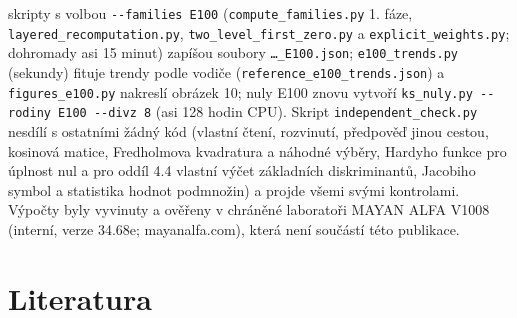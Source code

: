 \documentclass[
  10pt,
]{article}
\begin{document}
skripty s volbou \texttt{-\/-families\ E100}
(\texttt{compute\_families.py} 1. fáze,
\texttt{layered\_recomputation.py}, \texttt{two\_level\_first\_zero.py}
a \texttt{explicit\_weights.py}; dohromady asi 15 minut) zapíšou soubory
\texttt{…\_E100.json}; \texttt{e100\_trends.py} (sekundy) fituje trendy
podle vodiče (\texttt{reference\_e100\_trends.json}) a
\texttt{figures\_e100.py} nakreslí obrázek 10; nuly E100 znovu vytvoří
\texttt{ks\_nuly.py\ -\/-rodiny\ E100\ -\/-divz\ 8} (asi 128 hodin CPU).
Skript \texttt{independent\_check.py} nesdílí s ostatními žádný kód
(vlastní čtení, rozvinutí, předpověď jinou cestou, kosinová matice,
Fredholmova kvadratura a náhodné výběry, Hardyho funkce pro úplnost nul
a pro oddíl 4.4 vlastní výčet základních diskriminantů, Jacobiho symbol
a statistika hodnot podmnožin) a projde všemi svými kontrolami. Výpočty
byly vyvinuty a ověřeny v chráněné laboratoři MAYAN ALFA V1008 (interní,
verze 34.68e; mayanalfa.com), která není součástí této publikace.

\hypertarget{literatura}{%
\section{Literatura}\label{literatura}}
\small
\end{document}
